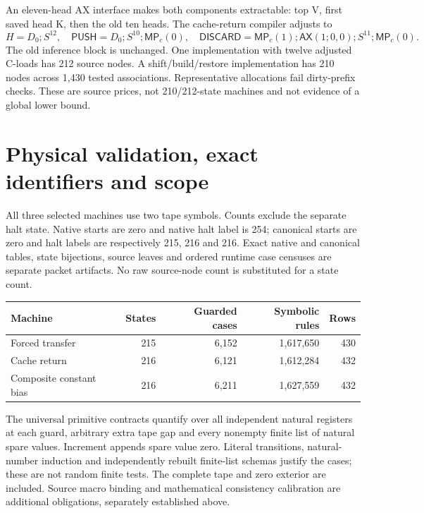 \documentclass[11pt]{article}
\newcommand{\MP}{\mathsf{MP}}
\newcommand{\AX}{\mathsf{AX}}
\newcommand{\PUSH}{\mathsf{PUSH}}
\newcommand{\DISCARD}{\mathsf{DISCARD}}
\begin{document}
An eleven-head AX interface makes both components extractable: top V, first saved head K, then the old ten heads. The cache-return compiler adjusts to
\[
 H=D_0;S^{12},\quad \PUSH=D_0;S^{10};\MP_c(0),\quad
 \DISCARD=\MP_c(1);\AX(1;0,0);S^{11};\MP_c(0).
\]
The old inference block is unchanged. One implementation with twelve adjusted C-loads has 212 source nodes. A shift/build/restore implementation has 210 nodes across 1,430 tested associations. Representative allocations fail dirty-prefix checks. These are source prices, not 210/212-state machines and not evidence of a global lower bound.

\section{Physical validation, exact identifiers and scope}
All three selected machines use two tape symbols. Counts exclude the separate halt state. Native starts are zero and native halt label is 254; canonical starts are zero and halt labels are respectively 215, 216 and 216. Exact native and canonical tables, state bijections, source leaves and ordered runtime case censuses are separate packet artifacts. No raw source-node count is substituted for a state count.
\begin{center}\small
\begin{tabular}{lrrrr}
\toprule
Machine & States & Guarded cases & Symbolic rules & Rows\\\midrule
Forced transfer &215&6,152&1,617,650&430\\
Cache return &216&6,121&1,612,284&432\\
Composite constant bias &216&6,211&1,627,559&432\\\bottomrule
\end{tabular}
\end{center}
The universal primitive contracts quantify over all independent natural registers at each guard, arbitrary extra tape gap and every nonempty finite list of natural spare values. Increment appends spare value zero. Literal transitions, natural-number induction and independently rebuilt finite-list schemas justify the cases; these are not random finite tests. The complete tape and zero exterior are included. Source macro binding and mathematical consistency calibration are additional obligations, separately established above.
\end{document}
